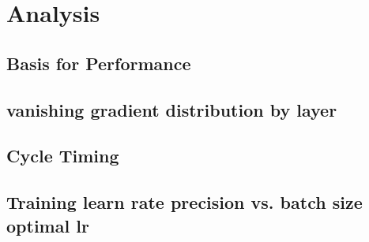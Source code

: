 \chapter{Analysis}\label{analysis}
\section{Basis for Performance}
\section{vanishing gradient distribution by layer}
\section{Cycle Timing}
\section{Training learn rate precision vs. batch size optimal lr}

